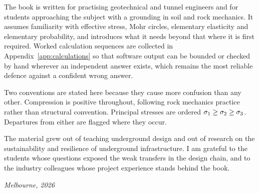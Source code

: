 The book is written for practising geotechnical and tunnel engineers and for
students approaching the subject with a grounding in soil and rock mechanics.
It assumes familiarity with effective stress, Mohr circles, elementary
elasticity and elementary probability, and introduces what it needs beyond
that where it is first required. Worked calculation sequences are collected
in Appendix~\ref{app:calculations} so that software output can be bounded or checked by hand
wherever an independent answer exists, which remains the most reliable defence against a confident wrong
answer.

Two conventions are stated here because they cause more confusion than any
other. Compression is positive throughout, following rock mechanics practice
rather than structural convention. Principal stresses are ordered
$\sigma_1 \geq \sigma_2 \geq \sigma_3$. Departures from either are flagged
where they occur.

The material grew out of teaching underground design and out of research on
the sustainability and resilience of underground infrastructure. I am grateful to the students whose questions exposed the
weak transfers in the design chain, and to the industry colleagues whose
project experience stands behind the book.

\vspace{\baselineskip}
\noindent\textit{Melbourne, 2026}
